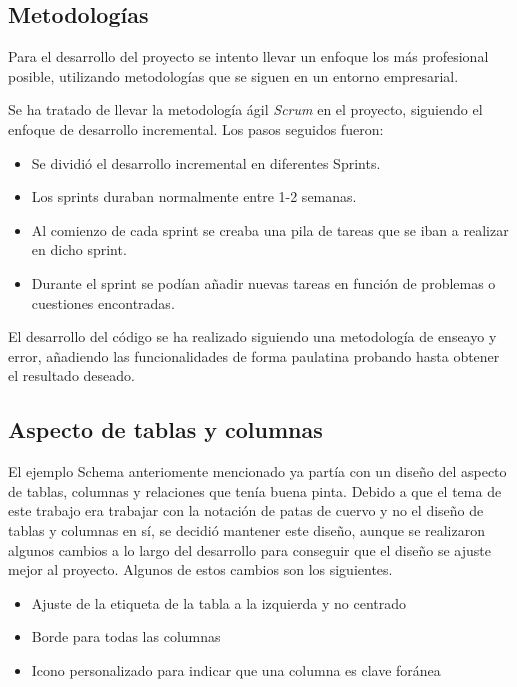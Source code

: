 \subsection{Metodologías}

Para el desarrollo del proyecto se intento llevar un enfoque los más profesional posible, utilizando metodologías que se siguen en un entorno empresarial.

Se ha tratado de llevar la metodología ágil \emph{Scrum} en el proyecto, siguiendo el enfoque de desarrollo incremental. Los pasos seguidos fueron:
\begin{itemize}
    \item Se dividió el desarrollo incremental en diferentes Sprints.
    \item Los sprints duraban normalmente entre 1-2 semanas.
    \item Al comienzo de cada sprint se creaba una pila de tareas que se iban a realizar en dicho sprint.
    \item Durante el sprint se podían añadir nuevas tareas en función de problemas o cuestiones encontradas.
\end{itemize}

El desarrollo del código se ha realizado siguiendo una metodología de enseayo y error, añadiendo las funcionalidades de forma paulatina probando hasta obtener el resultado deseado.

\subsection{Aspecto de tablas y columnas}

El ejemplo Schema anteriomente mencionado ya partía con un diseño del aspecto de tablas, columnas y relaciones que tenía buena pinta. Debido a que el tema de este trabajo era trabajar con la notación de patas de cuervo y no el diseño de tablas y columnas en sí, se decidió mantener este diseño, aunque se realizaron algunos cambios a lo largo del desarrollo para conseguir que el diseño se ajuste mejor al proyecto. Algunos de estos cambios son los siguientes.
\begin{itemize}
    \item Ajuste de la etiqueta de la tabla a la izquierda y no centrado
    \item Borde para todas las columnas
    \item Icono personalizado para indicar que una columna es clave foránea
\end{itemize}

